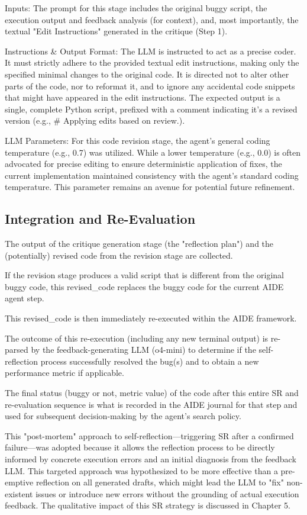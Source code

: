 Inputs: The prompt for this stage includes the original buggy script, the execution output and feedback analysis (for context), and, most importantly, the textual "Edit Instructions" generated in the critique (Step 1).

Instructions \& Output Format: The LLM is instructed to act as a precise coder. It must strictly adhere to the provided textual edit instructions, making only the specified minimal changes to the original code. It is directed not to alter other parts of the code, nor to reformat it, and to ignore any accidental code snippets that might have appeared in the edit instructions. The expected output is a single, complete Python script, prefixed with a comment indicating it's a revised version (e.g., \# Applying edits based on review.).

LLM Parameters: For this code revision stage, the agent's general coding temperature (e.g., 0.7) was utilized. While a lower temperature (e.g., 0.0) is often advocated for precise editing to ensure deterministic application of fixes, the current implementation maintained consistency with the agent's standard coding temperature. This parameter remains an avenue for potential future refinement.

\subsection{Integration and Re-Evaluation}

The output of the critique generation stage (the "reflection plan") and the (potentially) revised code from the revision stage are collected.

If the revision stage produces a valid script that is different from the original buggy code, this revised\_code replaces the buggy code for the current AIDE agent step.

This revised\_code is then immediately re-executed within the AIDE framework.

The outcome of this re-execution (including any new terminal output) is re-parsed by the feedback-generating LLM (o4-mini) to determine if the self-reflection process successfully resolved the bug(s) and to obtain a new performance metric if applicable.

The final status (buggy or not, metric value) of the code after this entire SR and re-evaluation sequence is what is recorded in the AIDE journal for that step and used for subsequent decision-making by the agent's search policy.

This "post-mortem" approach to self-reflection—triggering SR after a confirmed failure—was adopted because it allows the reflection process to be directly informed by concrete execution errors and an initial diagnosis from the feedback LLM. This targeted approach was hypothesized to be more effective than a pre-emptive reflection on all generated drafts, which might lead the LLM to "fix" non-existent issues or introduce new errors without the grounding of actual execution feedback. The qualitative impact of this SR strategy is discussed in Chapter 5.

